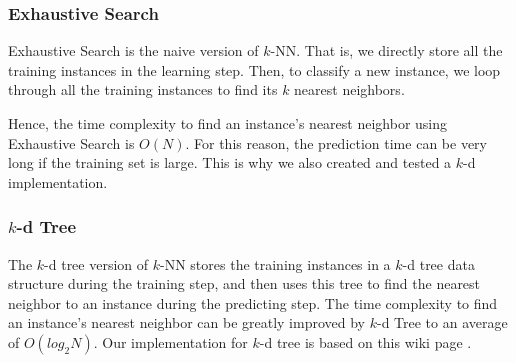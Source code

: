 \subsubsection{Exhaustive Search}
Exhaustive Search is the naive version of $k$-NN. That is, we directly store all the training instances in the learning step. Then, to classify a new instance, we loop through all the training instances to find its $k$ nearest neighbors.

 Hence, the time complexity to find an instance's nearest neighbor using Exhaustive Search is $O(N)$. For this reason, the prediction time can be very long if the training set is large. This is why we also created and tested a $k$-d implementation.

\subsubsection{$k$-d Tree}
The $k$-d tree version of $k$-NN stores the training instances in a $k$-d tree data structure during the training step, and then uses this tree to find the nearest neighbor to an instance during the predicting step. The time complexity to find an instance's nearest neighbor can be greatly improved by $k$-d Tree to an average of $O(log_2N)$. Our implementation for $k$-d tree is based on this wiki page \cite{KDWiki}.